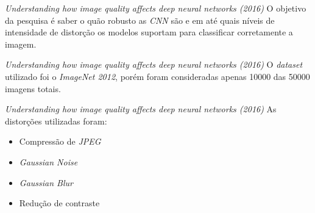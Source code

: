 \begin{frame}[plain]
    \begin{figure}
        \centering
    \end{figure}
\end{frame}


\begin{frame}{\textit{Understanding how image quality affects deep neural networks (2016)}}
    O objetivo da pesquisa é saber o quão robusto as \textit{CNN} são e em até quais níveis de intensidade de distorção os modelos suportam para classificar corretamente a imagem.
\end{frame}

\begin{frame}{\textit{Understanding how image quality affects deep neural networks (2016)}}
    O \textit{dataset} utilizado foi o \textit{ImageNet 2012}, porém foram consideradas apenas 10000 das 50000 imagens totais.
\end{frame}
\begin{frame}{\textit{Understanding how image quality affects deep neural networks (2016)}}
    As distorções utilizadas foram:
\begin{itemize}
    \item Compressão de \textit{JPEG}
    \item \textit{Gaussian Noise}
    \item \textit{Gaussian Blur}
    \item Redução de contraste
\end{itemize}
\end{frame}
    
